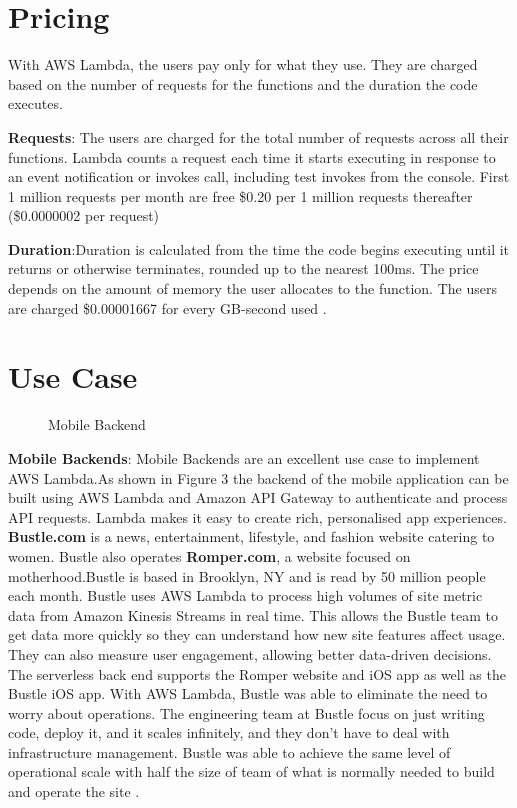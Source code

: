 \documentclass[9pt,twocolumn,twoside]{../../styles/osajnl}
\begin{document}
\section{Pricing}
With AWS Lambda, the users pay only for what they use. They are charged based 
on the number of requests for the functions and the duration the code executes. 

\textbf{Requests}: The users are charged for the total number of requests 
across all their functions. Lambda counts a request each time it starts 
executing in response to an event notification or invokes call, including test 
invokes from the console. First 1 million requests per month are free
\$0.20 per 1 million requests thereafter (\$0.0000002 per request)

\textbf{Duration}:Duration is calculated from the time the code begins 
executing until it returns or otherwise terminates, rounded up to the nearest 
100ms. The price depends on the amount of memory the user allocates to the 
function. The users are charged \$0.00001667 for every GB-second used 
\cite{www-AWSLambdaPricing}.

\section{Use Case}



\renewcommand{\labelitemi}{\scriptsize$\bullet$} 
\begin{figure}[H]
\centering
\graphicspath{ {images/} }
\caption{Mobile Backend} \cite{www-AWSLambda}
\label{fig:false-color}
\end{figure}

\textbf{Mobile Backends}: Mobile Backends are an excellent use case to 
implement AWS Lambda.As shown in Figure 3 the backend of the mobile application 
can be built using AWS Lambda and Amazon API Gateway to authenticate and 
process API requests. Lambda makes it easy to create rich, personalised app 
experiences.
\textbf{Bustle.com} is a news, entertainment, lifestyle, and fashion website 
catering to women. Bustle also operates \textbf{Romper.com}, a website focused 
on motherhood.Bustle is based in Brooklyn, NY and is read by 50 million people 
each month. Bustle uses AWS Lambda to process high volumes of site metric data 
from Amazon Kinesis Streams \cite{www-AWSKinesis} in real time. This allows the 
Bustle team to get data more quickly so they can understand how new site 
features affect usage. They can also measure user engagement, allowing better 
data-driven decisions. The serverless back end supports the Romper website and 
iOS app as well as the Bustle iOS app. With AWS Lambda, Bustle was able to 
eliminate the need to worry about operations. The engineering team at Bustle 
focus on just writing code, deploy it, and it scales infinitely, and they don't 
have to deal with infrastructure management. Bustle was able to achieve the 
same level of operational scale with half the size of team of what is normally 
needed to build and operate the site  \cite{www-AWSLambdaBustle}.
\end{document}

